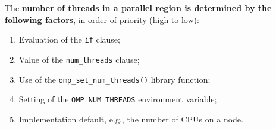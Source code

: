 The \textbf{number of threads in a parallel region is determined by the following factors}, in order of priority (high to low):
\begin{enumerate}
    \item Evaluation of the \texttt{if} clause;
    \item Value of the \texttt{num\_threads} clause;
    \item Use of the \texttt{omp\_set\_num\_threads()} library function;
    \item Setting of the \texttt{OMP\_NUM\_THREADS} environment variable;
    \item Implementation default, e.g., the number of CPUs on a node.
\end{enumerate}

